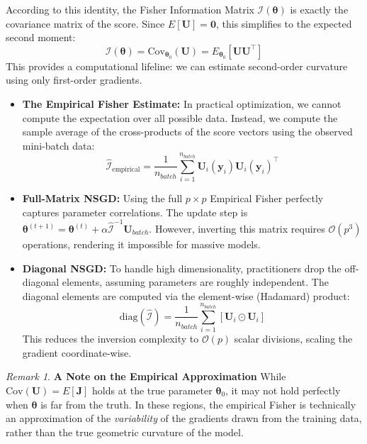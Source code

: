\documentclass[
  letterpaper,
  DIV=11,
  numbers=noendperiod]{scrreprt}
\renewcommand{\[}{\begin{equation}}
\renewcommand{\]}{\end{equation}}
\theoremstyle{definition}
\theoremstyle{plain}
\theoremstyle{plain}
\theoremstyle{plain}
\theoremstyle{definition}
\theoremstyle{plain}
\theoremstyle{remark}
\newtheorem{refremark}{Remark}[chapter]
\begin{document}
According to this identity, the Fisher Information Matrix
\(\mathcal{I}(\boldsymbol{\theta})\) is exactly the covariance matrix of
the score. Since \(E[\mathbf{U}] = \mathbf{0}\), this simplifies to the
expected second moment: \[
\mathcal{I}(\boldsymbol{\theta}) = \text{Cov}_{\boldsymbol{\theta}_0}(\mathbf{U}) = E_{\boldsymbol{\theta}_0}[\mathbf{U}\mathbf{U}^\top]
\] This provides a computational lifeline: we can estimate second-order
curvature using only first-order gradients.

\begin{itemize}
\item
  \textbf{The Empirical Fisher Estimate:} In practical optimization, we
  cannot compute the expectation over all possible data. Instead, we
  compute the sample average of the cross-products of the score vectors
  using the observed mini-batch data: \[
    \hat{\mathcal{I}}_{\text{empirical}} = \frac{1}{n_{batch}} \sum_{i=1}^{n_{batch}} \mathbf{U}_i(\mathbf{y}_i) \mathbf{U}_i(\mathbf{y}_i)^\top
    \]
\item
  \textbf{Full-Matrix NSGD:} Using the full \(p \times p\) Empirical
  Fisher perfectly captures parameter correlations. The update step is
  \(\boldsymbol{\theta}^{(t+1)} = \boldsymbol{\theta}^{(t)} + \alpha \hat{\mathcal{I}}^{-1} \mathbf{U}_{batch}\).
  However, inverting this matrix requires \(\mathcal{O}(p^3)\)
  operations, rendering it impossible for massive models.
\item
  \textbf{Diagonal NSGD:} To handle high dimensionality, practitioners
  drop the off-diagonal elements, assuming parameters are roughly
  independent. The diagonal elements are computed via the element-wise
  (Hadamard) product: \[
    \text{diag}(\hat{\mathcal{I}}) = \frac{1}{n_{batch}} \sum_{i=1}^{n_{batch}} [ \mathbf{U}_i \odot \mathbf{U}_i ]
    \] This reduces the inversion complexity to \(\mathcal{O}(p)\)
  scalar divisions, scaling the gradient coordinate-wise.
\end{itemize}

\begin{refremark}
\textbf{A Note on the Empirical Approximation} While
\(\text{Cov}(\mathbf{U}) = E[\mathbf{J}]\) holds at the true parameter
\(\boldsymbol{\theta}_0\), it may not hold perfectly when
\(\boldsymbol{\theta}\) is far from the truth. In these regions, the
empirical Fisher is technically an approximation of the
\emph{variability} of the gradients drawn from the training data, rather
than the true geometric curvature of the model.

\label{rem-empirical-fisher-caveat}

\end{refremark}
\end{document}
